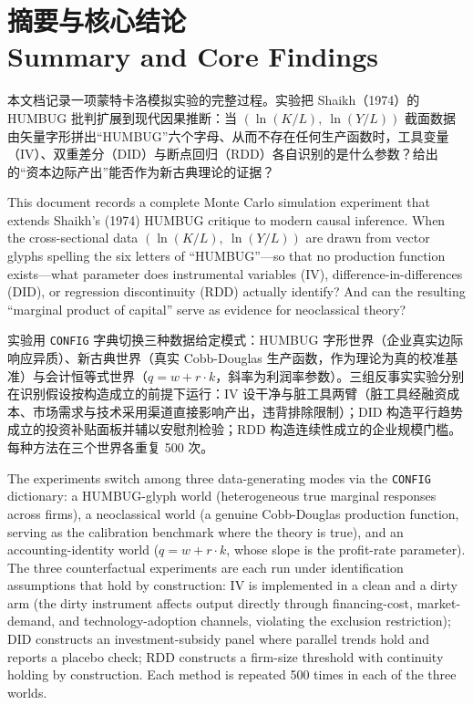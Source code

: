 \documentclass[12pt,a4paper]{ctexart}
\begin{document}
\pagestyle{fancy}


\section[摘要与核心结论]{摘要与核心结论\\[2pt]\normalsize Summary and Core Findings}

本文档记录一项蒙特卡洛模拟实验的完整过程。实验把 Shaikh（1974）的 HUMBUG 批判扩展到现代因果推断：当 $(\ln(K/L),\ \ln(Y/L))$ 截面数据由矢量字形拼出“HUMBUG”六个字母、从而不存在任何生产函数时，工具变量（IV）、双重差分（DID）与断点回归（RDD）各自识别的是什么参数？给出的“资本边际产出”能否作为新古典理论的证据？

This document records a complete Monte Carlo simulation experiment that extends Shaikh's (1974) HUMBUG critique to modern causal inference. When the cross-sectional data $(\ln(K/L),\ \ln(Y/L))$ are drawn from vector glyphs spelling the six letters of “HUMBUG”—so that no production function exists—what parameter does instrumental variables (IV), difference-in-differences (DID), or regression discontinuity (RDD) actually identify? And can the resulting “marginal product of capital” serve as evidence for neoclassical theory?

实验用 \texttt{CONFIG} 字典切换三种数据给定模式：HUMBUG 字形世界（企业真实边际响应异质）、新古典世界（真实 Cobb-Douglas 生产函数，作为理论为真的校准基准）与会计恒等式世界（$q = w + r\cdot k$，斜率为利润率参数）。三组反事实实验分别在识别假设按构造成立的前提下运行：IV 设干净与脏工具两臂（脏工具经融资成本、市场需求与技术采用渠道直接影响产出，违背排除限制）；DID 构造平行趋势成立的投资补贴面板并辅以安慰剂检验；RDD 构造连续性成立的企业规模门槛。每种方法在三个世界各重复 500 次。

The experiments switch among three data-generating modes via the \texttt{CONFIG} dictionary: a HUMBUG-glyph world (heterogeneous true marginal responses across firms), a neoclassical world (a genuine Cobb-Douglas production function, serving as the calibration benchmark where the theory is true), and an accounting-identity world ($q = w + r\cdot k$, whose slope is the profit-rate parameter). The three counterfactual experiments are each run under identification assumptions that hold by construction: IV is implemented in a clean and a dirty arm (the dirty instrument affects output directly through financing-cost, market-demand, and technology-adoption channels, violating the exclusion restriction); DID constructs an investment-subsidy panel where parallel trends hold and reports a placebo check; RDD constructs a firm-size threshold with continuity holding by construction. Each method is repeated 500 times in each of the three worlds.
\end{document}
